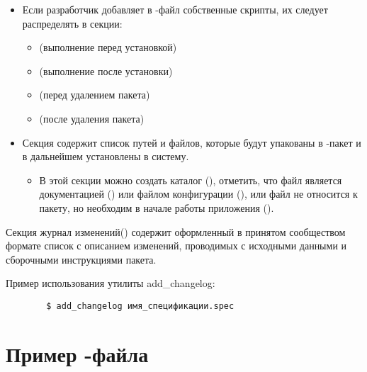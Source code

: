 \begin{itemize}
	\item Если разработчик добавляет в -файл собственные скрипты, их следует распределять в секции:
	\begin{itemize}
		\item {} (выполнение перед установкой)
		\item {} (выполнение после установки)
		\item {} (перед удалением пакета)
		\item {} (после удаления пакета)
	\end{itemize}
	\item Секция  содержит список путей и файлов, которые будут упакованы в -пакет
		и в дальнейшем установлены в систему.
	\begin{itemize}
		\item В этой секции можно создать каталог (), отметить, что файл является
			документацией () или файлом конфигурации (), или файл не
			относится к пакету, но необходим в начале работы приложения ().
	\end{itemize}
\end{itemize}



Секция журнал изменений() содержит оформленный в принятом сообществом формате список
с описанием изменений, проводимых с исходными данными и сборочными инструкциями пакета.


Пример использования утилиты add\_changelog:
\begin{verbatim}
        $ add_changelog имя_спецификации.spec
\end{verbatim}

\section{Пример -файла}

